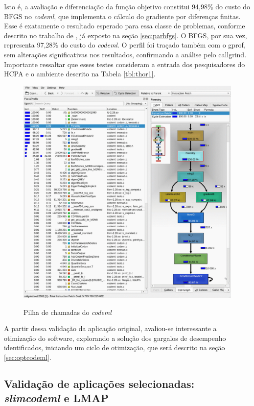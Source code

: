\documentclass[cic,tc]{iiufrgs}
\begin{document}
Isto é, a avaliação e diferenciação da função objetivo constitui 94,98\% do
custo do BFGS no \textit{codeml}, que implementa o cálculo do gradiente por diferenças
finitas. Esse é exatamente o resultado esperado para essa classe de problemas,
conforme descrito no trabalho de \cite{byrd1988parallel}, já exposto na seção
\ref{sec:parbfgs}. O BFGS, por sua vez, representa 97,28\% do custo do \textit{codeml}.
O perfil foi traçado também com o gprof, sem alterações significativas nos
resultados, confirmando a análise pelo callgrind. Importante ressaltar que
esses testes consideram a entrada dos pesquisadores do HCPA e o ambiente
descrito na Tabela \ref{tbl:thor1}.

\begin{figure} \caption{Pilha de chamadas do \textit{codeml}} \begin{center}
\includegraphics[width=0.9\linewidth]{img/kcachegrind.png} \end{center}
 \label{fig:kcachegrind} \end{figure}

A partir dessa validação da aplicação original, avaliou-se interessante a
otimização do software, explorando a solução dos gargalos de desempenho
identificados, iniciando um ciclo de otimização, que será descrito na seção
\ref{sec:optcodeml}.

\subsection{Validação de aplicações selecionadas: \textit{slimcodeml} e LMAP}
\label{sec:slimeval}
\end{document}
